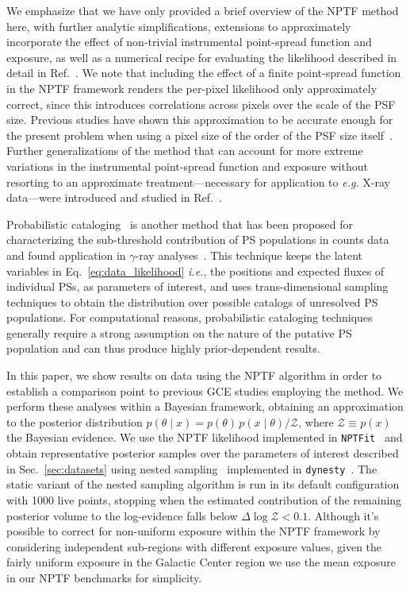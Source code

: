 \documentclass[prd,aps,10pt,nofootinbib,twocolumn,superscriptaddress,preprintnumbers,balancelastpage,longbibliography,floatfix]{revtex4-2}
\begin{document}
We emphasize that we have only provided a brief overview of the NPTF method here, with further analytic simplifications, extensions to approximately incorporate the effect of non-trivial instrumental point-spread function and exposure, as well as a numerical recipe for evaluating the likelihood described in detail in Ref.~\cite{Mishra-Sharma:2016gis}. We note that including the effect of a finite point-spread function in the NPTF framework renders the per-pixel likelihood only approximately correct, since this introduces correlations across pixels over the scale of the PSF size. Previous studies have shown this approximation to be accurate enough for the present problem when using a pixel size of the order of the PSF size itself~\cite{Chang:2019ars}. Further generalizations of the method that can account for more extreme variations in the instrumental point-spread function and exposure without resorting to an approximate treatment---necessary for application to \emph{e.g.} X-ray data---were introduced and studied in Ref.~\cite{Collin:2021ufc}. 

Probabilistic cataloging~\cite{2013AJ....146....7B,2021arXiv210202409L} is another method that has been proposed for characterizing the sub-threshold contribution of PS populations in counts data and found application in $\gamma$-ray analyses~\cite{Daylan:2016tia}. This technique keeps the latent variables in Eq.~\eqref{eq:data_likelihood} \emph{i.e.}, the positions and expected fluxes of individual PSs, as parameters of interest, and uses trans-dimensional sampling techniques to obtain the distribution over possible catalogs of unresolved PS populations. For computational reasons, probabilistic cataloging techniques generally require a strong assumption on the nature of the putative PS population and can thus produce highly prior-dependent results.

In this paper, we show results on \Fermi data using the NPTF algorithm in order to establish a comparison point to previous GCE studies employing the method. We perform these analyses within a Bayesian framework, obtaining an approximation to the posterior distribution $p(\theta\mid x) = p(\theta)\, p(x\mid\theta) / \mathcal Z$, where $\mathcal Z \equiv p(x)$ the Bayesian evidence. 
We use the NPTF likelihood implemented in \texttt{NPTFit}~\cite{Mishra-Sharma:2016gis} and obtain representative posterior samples over the parameters of interest described in Sec.~\ref{sec:datasets} using nested sampling~\cite{Feroz:2013hea,skilling2006} implemented in \texttt{dynesty}~\cite{Speagle_2020}. The static variant of the nested sampling algorithm is run in its default configuration with 1000 live points, stopping when the estimated contribution of the remaining posterior volume to the log-evidence falls below $\Delta \log \mathcal Z < 0.1$. Although it's possible to correct for non-uniform exposure within the NPTF framework by considering independent sub-regions with different exposure values, given the fairly uniform \Fermi exposure in the Galactic Center region we use the mean exposure in our NPTF benchmarks for simplicity.
\end{document}
